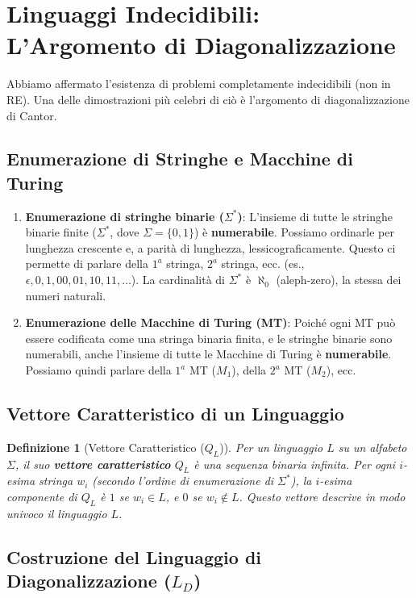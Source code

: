 \documentclass[a4paper]{article}
\newtheorem{definition}{Definizione}
\begin{document}
\section{Linguaggi Indecidibili: L'Argomento di Diagonalizzazione}

Abbiamo affermato l'esistenza di problemi completamente indecidibili (non in RE). Una delle dimostrazioni più celebri di ciò è l'argomento di diagonalizzazione di Cantor.

\subsection{Enumerazione di Stringhe e Macchine di Turing}

\begin{enumerate}
    \item \textbf{Enumerazione di stringhe binarie ($\Sigma^*$)}: L'insieme di tutte le stringhe binarie finite ($\Sigma^*$, dove $\Sigma = \{0,1\}$) è \textbf{numerabile}. Possiamo ordinarle per lunghezza crescente e, a parità di lunghezza, lessicograficamente. Questo ci permette di parlare della $1^{a}$ stringa, $2^{a}$ stringa, ecc. (es., $\epsilon, 0, 1, 00, 01, 10, 11, \dots$). La cardinalità di $\Sigma^*$ è $\aleph_0$ (aleph-zero), la stessa dei numeri naturali.
    \item \textbf{Enumerazione delle Macchine di Turing (MT)}: Poiché ogni MT può essere codificata come una stringa binaria finita, e le stringhe binarie sono numerabili, anche l'insieme di tutte le Macchine di Turing è \textbf{numerabile}. Possiamo quindi parlare della $1^{a}$ MT ($M_1$), della $2^{a}$ MT ($M_2$), ecc.
\end{enumerate}

\subsection{Vettore Caratteristico di un Linguaggio}

\begin{definition}[Vettore Caratteristico ($Q_L$)]
Per un linguaggio $L$ su un alfabeto $\Sigma$, il suo \textbf{vettore caratteristico} $Q_L$ è una sequenza binaria infinita. Per ogni $i$-esima stringa $w_i$ (secondo l'ordine di enumerazione di $\Sigma^*$), la $i$-esima componente di $Q_L$ è $1$ se $w_i \in L$, e $0$ se $w_i \notin L$. Questo vettore descrive in modo univoco il linguaggio $L$.
\end{definition}

\subsection{Costruzione del Linguaggio di Diagonalizzazione ($L_D$)}
\end{document}
